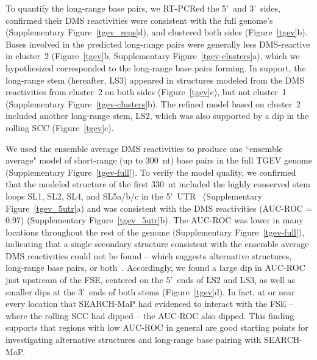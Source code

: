 \documentclass[main.tex]{subfiles}
\begin{document}
To quantify the long-range base pairs, we RT-PCRed the 5'~and 3'~sides, confirmed their DMS reactivities were consistent with the full genome's (Supplementary Figure~\ref{tgev_reps}d), and clustered both sides (Figure~\ref{tgev}b).
Bases involved in the predicted long-range pairs were generally less DMS-reactive in cluster~2 (Figure~\ref{tgev}b, Supplementary Figure~\ref{tgev-clusters}a), which we hypothesized corresponded to the long-range base pairs forming.
In support, the long-range stem (hereafter, LS3) appeared in structures modeled from the DMS reactivities from cluster~2 on both sides (Figure~\ref{tgev}c), but not cluster~1 (Supplementary Figure~\ref{tgev-clusters}b).
The refined model based on cluster~2 included another long-range stem, LS2, which was also supported by a dip in the rolling SCC (Figure~\ref{tgev}c).

We used the ensemble average DMS reactivities to produce one ``ensemble average" model of short-range (up to 300~nt) base pairs in the full TGEV genome (Supplementary Figure~\ref{tgev-full}).
To verify the model quality, we confirmed that the modeled structure of the first 330~nt included the highly conserved stem loops SL1, SL2, SL4, and SL5a/b/c in the 5'~UTR~\cite{Yang2015a} (Supplementary Figure~\ref{tgev_5utr}a) and was consistent with the DMS reactivities (AUC-ROC = 0.97) (Supplementary Figure~\ref{tgev_5utr}b).
The AUC-ROC was lower in many locations throughout the rest of the genome (Supplementary Figure~\ref{tgev-full}), indicating that a single secondary structure consistent with the ensemble average DMS reactivities could not be found -- which suggests alternative structures, long-range base pairs, or both~\cite{Lan2022}.
Accordingly, we found a large dip in AUC-ROC just upstream of the FSE, centered on the 5'~ends of LS2 and LS3, as well as smaller dips at the 3'~ends of both stems (Figure~\ref{tgev}d).
In fact, at or near every location that SEARCH-MaP had evidenced to interact with the FSE -- where the rolling SCC had dipped -- the AUC-ROC also dipped.
This finding supports that regions with low AUC-ROC in general are good starting points for investigating alternative structures and long-range base pairing with SEARCH-MaP.
\end{document}
